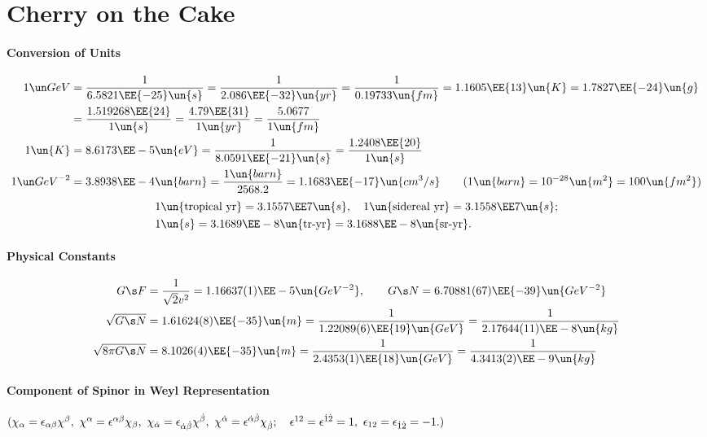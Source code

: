 
\section{Cherry on the Cake}
\paragraph{Conversion of Units}
\begin{align}
 1\GeV &= \frac1{6.5821\EE{-25}\un{s}} = \frac1{2.086\EE{-32}\un{yr}}
        = \frac1{0.19733\un{fm}}  = 1.1605\EE{13}\un{K} = 1.7827\EE{-24}\un{g}\notag\\
       &= \frac{1.519268\EE{24}}{1\un{s}} = \frac{4.79\EE{31}}{1\un{yr}}
        = \frac{5.0677}{1\un{fm}}\\
1\un{K}&= 8.6173\EE-5\un{eV} = \frac1{8.0591\EE{-21}\un{s}} = \frac{1.2408\EE{20}}{1\un{s}}\\
1\GeV^{-2}&= 3.8938\EE-4\un{barn} = \frac{1\un{barn}}{2568.2}=1.1683\EE{-17}\un{cm^3/s}\qquad(1\un{barn}=10^{-28}\un{m^2} = 100\un{fm^2})
\end{align}
\vspace{-2zw}
\begin{equation}\begin{split}
 &1\un{\text{tropical yr}} = 3.1557\EE7\un{s},\quad 1\un{\text{sidereal yr}} = 3.1558\EE7\un{s};\\
 &1\un{s} = 3.1689\EE-8\un{\text{tr-yr}} = 3.1688\EE-8\un{\text{sr-yr}}.
\end{split}\end{equation}
\paragraph{Physical Constants}
\begin{align}
 G\s F &= \frac{1}{\sqrt2v^2} = 1.16637(1)\EE-5\un{GeV^{-2}},\qquad
 G\s N = 6.70881(67)\EE{-39}\un{GeV^{-2}}\\
 \sqrt{G\s N} &= 1.61624(8)\EE{-35}\un{m} = \frac1{1.22089(6)\EE{19}\un{GeV}}
               = \frac1{2.17644(11)\EE-8\un{kg}}\\
 \sqrt{8\pi G\s N}&= 8.1026(4)\EE{-35}\un{m} = \frac1{2.4353(1)\EE{18}\un{GeV}}
                   = \frac1{4.3413(2)\EE-9\un{kg}}
\end{align}
\paragraph{Component of Spinor in Weyl Representation}\mbox{}\par
$(\chi_\alpha=\epsilon_{\alpha\beta}\chi^\beta,\
  \chi^\alpha=\epsilon^{\alpha\beta}\chi_\beta,\
  \chi_{\dot\alpha}=\epsilon_{{\dot\alpha}{\dot\beta}}\chi^{\dot\beta},\
  \chi^{\dot\alpha}=\epsilon^{{\dot\alpha}{\dot\beta}}\chi_{\dot\beta};\quad
  \epsilon^{12}=\epsilon^{\dot1\dot2}=1, \
  \epsilon_{12}=\epsilon_{\dot1\dot2}=-1.)$

